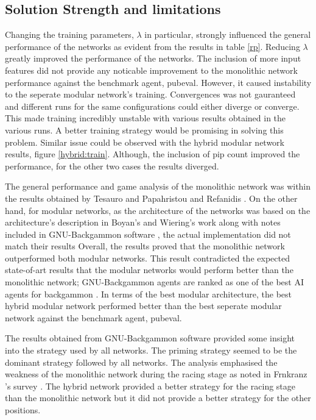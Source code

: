 \documentclass[12pt,a4paper]{article}
\begin{document}
\subsection{Solution Strength and limitations}
Changing the training parameters, $\lambda$ in particular, strongly influenced the general performance of the networks as evident from the results in table \ref{rp}. Reducing $\lambda$ greatly improved the performance of the networks. The inclusion of more input features did not provide any noticable improvement to the monolithic network performance against the benchmark agent, pubeval. However, it caused instability to the seperate modular network's training. Convergences was not gauranteed and different runs for the same configurations could either diverge or converge. This made training incredibly unstable with various results obtained in the various runs. A better training strategy would be promising in solving this problem. Similar issue could be observed with the hybrid modular network results, figure \ref{hybrid:train}. Although, the inclusion of pip count improved the performance, for the other two cases the results diverged. 

The general performance and game analysis of the monolithic network was within the results obtained by Tesauro \citeyear{DBLP:journals/ai/Tesauro02} and Papahristou and Refanidis \citeyear{DBLP:conf/ifip12/PapahristouR12}. On the other hand, for modular networks, as the architecture of the networks was based on the architecture's description in Boyan's \citeyear{boyan} and Wiering's \citeyear{DBLP:journals/jilsa/Wiering10} work along with notes included in GNU-Backgammon software \cite{gnubg}, the actual implementation did not match their results Overall, the results proved that the monolithic network outperformed both modular networks. This result contradicted the expected state-of-art results that the modular networks would perform better than the monolithic network; GNU-Backgammon agents are ranked as one of the best AI agents for backgammon \cite{exg}. In terms of the best modular architecture, the best hybrid modular network performed better than the best seperate modular network against the benchmark agent, pubeval. 

The results obtained from GNU-Backgammon software provided some insight into the strategy used by all networks. The priming strategy seemed to be the dominant strategy followed by all networks. The analysis emphasised the weakness of the monolithic network during the racing stage as noted in Frnkranz 's survey \citeyear{survey}. The hybrid network provided a better strategy for the racing stage than the monolithic network but it did not provide a better strategy for the other positions. 
\end{document}
